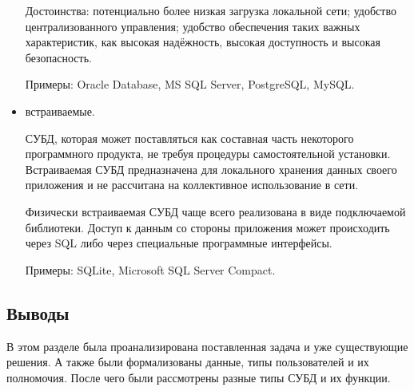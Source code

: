 \begin{itemize}
	Достоинства: потенциально более низкая загрузка локальной сети; удобство централизованного управления; удобство обеспечения таких важных характеристик, как высокая надёжность, высокая доступность и высокая безопасность.
	
	Примеры: Oracle Database, MS SQL Server, PostgreSQL, MySQL.
	
	\item встраиваемые.
	
	СУБД, которая может поставляться как составная часть некоторого программного продукта, не требуя процедуры самостоятельной установки. Встраиваемая СУБД предназначена для локального хранения данных своего приложения и не рассчитана на коллективное использование в сети.
	
	Физически встраиваемая СУБД чаще всего реализована в виде подключаемой библиотеки. Доступ к данным со стороны приложения может происходить через SQL либо через специальные программные интерфейсы.
	
	Примеры: SQLite, Microsoft SQL Server Compact.
	
\end{itemize}

\subsection*{Выводы}

В этом разделе была проанализирована поставленная задача и уже существующие решения. А также были формализованы данные, типы пользователей и их полномочия. После чего были рассмотрены разные типы СУБД и их функции.


